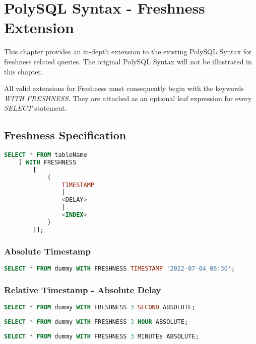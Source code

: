\chapter{PolySQL Syntax - Freshness Extension}


This chapter provides an in-depth extension to the existing PolySQL Syntax for freshness related queries.
The original PolySQL Syntax will not be illustrated in this chapter.

All valid extensions for Freshness must consequently begin with the keywords \emph{WITH FRESHNESS}.
They are attached as an optional leaf expression for every \emph{SELECT} statement.

\tocless\section{Freshness Specification}
\label{a:syntax}


\begin{lstlisting}[language=sql]
    SELECT * FROM tableName 
    [ WITH FRESHNESS 
        [ 
            ( 
                TIMESTAMP 
                | 
                <DELAY> 
                | 
                <INDEX> 
            )   
        ]];
\end{lstlisting}

\tocless\subsection{Absolute Timestamp}

\begin{lstlisting}[language=sql]
    SELECT * FROM dummy WITH FRESHNESS TIMESTAMP '2022-07-04 06:30';
\end{lstlisting}


\tocless\subsection{Relative Timestamp - Absolute Delay}

\begin{lstlisting}[language=sql]
    SELECT * FROM dummy WITH FRESHNESS 3 SECOND ABSOLUTE;
\end{lstlisting}

\begin{lstlisting}[language=sql]
    SELECT * FROM dummy WITH FRESHNESS 3 HOUR ABSOLUTE;
\end{lstlisting}

\begin{lstlisting}[language=sql]
    SELECT * FROM dummy WITH FRESHNESS 3 MINUTEs ABSOLUTE;
\end{lstlisting}

